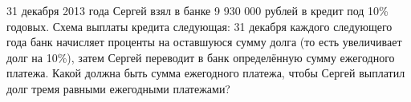 \begin{ex}
	\begin{condition}
	31 декабря 2013 года Сергей взял в банке 9 930 000 рублей в кредит под 10\% годовых. Схема выплаты кредита следующая: 31 декабря каждого следующего года банк начисляет проценты на оставшуюся сумму долга (то есть увеличивает долг на 10\%), затем Сергей переводит в банк определённую сумму ежегодного платежа. Какой должна быть сумма ежегодного платежа, чтобы Сергей выплатил долг тремя равными ежегодными платежами?
	\end{condition}
\end{ex}